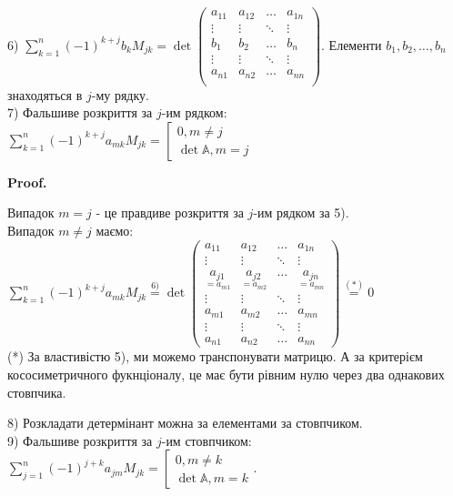 \documentclass[a4paper, 10pt]{article}
\makeatletter
\def\huge{\displaystyle}
\def\qed{$\blacksquare$}
\theoremstyle{theoremdd}
\theoremstyle{theoremdd}
\theoremstyle{theoremdd}
\theoremstyle{theoremdd}
\theoremstyle{theoremdd}
\theoremstyle{theoremdd}
\theoremstyle{theoremdd}
\theoremstyle{theoremdd}
\renewenvironment{proof}[1][Proof.\\]{\par
\pushQED{\hfill \qed}%
\normalfont \topsep6\p@\@plus6\p@\relax
\trivlist
\item\relax
{\bfseries
#1\@addpunct{.}}\hspace\labelsep\ignorespaces
}{%
\popQED\endtrivlist\@endpefalse
}
\makeatother
\begin{document}
6) $\huge\sum_{k=1}^n (-1)^{k+j} b_k M_{jk} = \det \begin{pmatrix}
a_{11} & a_{12} & \dots & a_{1n} \\
\vdots & \vdots & \ddots & \vdots \\
b_1 & b_2 & \dots & b_n \\
\vdots & \vdots & \ddots & \vdots \\
a_{n1} & a_{n2} & \dots & a_{nn} \\
\end{pmatrix}$. Елементи $b_1,b_2,\dots,b_n$ знаходяться в $j$-му рядку.
\bigskip \\
7) \textquotedbl Фальшиве\textquotedbl{} розкриття за $j$-им рядком: $\huge \sum_{k=1}^n (-1)^{k+j} a_{mk}M_{jk} = \left[\begin{gathered} 0, m \neq j \\ \det \mathbb{A}, m = j \end{gathered} \right.$

\begin{proof}
Випадок $m = j$ - це \textquotedbl правдиве\textquotedbl{} розкриття за $j$-им рядком за 5).\\
Випадок $m \neq j$ маємо:\\
$\huge \sum_{k=1}^n (-1)^{k+j} a_{mk} M_{jk} \overset{\textrm{6)}}{=} \det \begin{pmatrix}
a_{11} & a_{12} & \dots & a_{1n} \\
\vdots & \vdots & \ddots & \vdots \\
\underset{=a_{m1}}{a_{j1}} & \underset{=a_{m2}}{a_{j2}} & \dots & \underset{=a_{mn}}{a_{jn}} \\
\vdots & \vdots & \ddots & \vdots \\
a_{m1} & a_{m2} & \dots & a_{mn} \\
\vdots & \vdots & \ddots & \vdots \\
a_{n1} & a_{n2} & \dots & a_{nn}
\end{pmatrix} \overset{(*)}{=} 0$\\
(*) За властивістю 5), ми можемо транспонувати матрицю. А за критерієм кососиметричного фукнціоналу, це має бути рівним нулю через два однакових стовпчика.
\end{proof}

8) Розкладати детермінант можна за елементами за стовпчиком.\\
9) \textquotedbl Фальшиве\textquotedbl{} розкриття за $j$-им стовпчиком: $\huge \sum_{j=1}^n (-1)^{j+k} a_{jm}M_{jk} = \left[\begin{gathered} 0, m \neq k \\ \det \mathbb{A}, m = k \end{gathered} \right.$.
\end{document}
